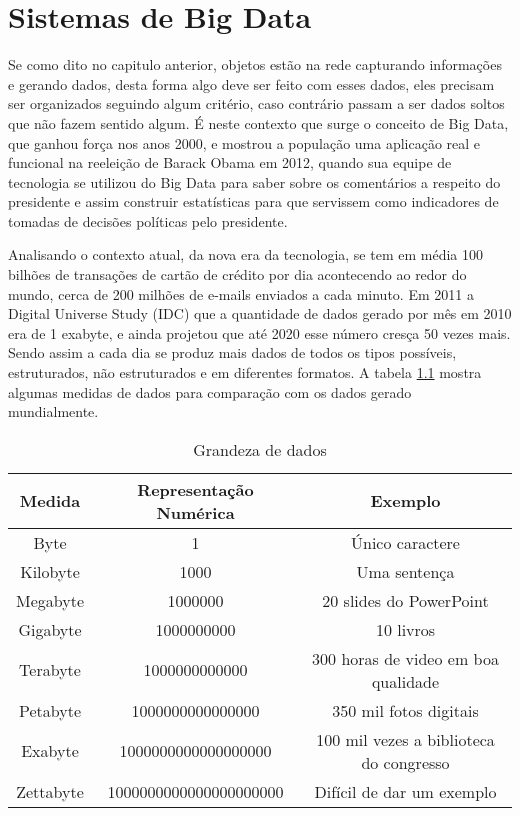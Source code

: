 \chapter{Sistemas de Big Data}
\label{chap:bigdata}
Se como dito no capitulo anterior, objetos estão na rede capturando informações e gerando dados, desta forma algo deve ser feito com esses dados, eles precisam ser organizados seguindo algum critério, caso contrário passam a ser dados soltos que não fazem sentido algum. É neste contexto que surge o conceito de Big Data, que ganhou força nos anos 2000, e mostrou a população uma aplicação real e funcional na reeleição de Barack Obama em 2012, quando sua equipe de tecnologia se utilizou do Big Data para saber sobre os comentários a respeito do presidente e assim construir estatísticas para que servissem como indicadores de tomadas de decisões políticas pelo presidente.

Analisando o contexto atual, da nova era da tecnologia, se tem em média 100 bilhões de transações de cartão de crédito por dia acontecendo ao redor do mundo, cerca de 200 milhões de e-mails enviados a cada minuto. Em 2011 a Digital Universe Study (IDC) que a quantidade de dados gerado por mês em 2010 era de 1 exabyte, e ainda projetou que até 2020 esse número cresça 50 vezes mais. Sendo assim a cada dia se produz mais dados de todos os tipos possíveis, estruturados, não estruturados e em diferentes formatos. A tabela \ref{tab:medidadados} mostra algumas medidas de dados para comparação com os dados gerado mundialmente.~\cite{sinha2014making}

\begin{table}[h]
\centering
\caption{Grandeza de dados}
\label{tab:medidadados}
\begin{tabular}{|c|c|c|}
\hline 
\rule[-1ex]{0pt}{2.5ex} \textbf{Medida} & \textbf{Representação Numérica} & \textbf{Exemplo} \\ 
\hline 
\rule[-1ex]{0pt}{2.5ex} Byte & 1 & Único caractere \\ 
\hline 
\rule[-1ex]{0pt}{2.5ex} Kilobyte & 1000 & Uma sentença \\ 
\hline 
\rule[-1ex]{0pt}{2.5ex} Megabyte & 1000000 & 20 slides do PowerPoint \\ 
\hline 
\rule[-1ex]{0pt}{2.5ex} Gigabyte & 1000000000 & 10 livros \\ 
\hline 
\rule[-1ex]{0pt}{2.5ex} Terabyte & 1000000000000 & 300 horas de video em boa qualidade \\ 
\hline 
\rule[-1ex]{0pt}{2.5ex} Petabyte & 1000000000000000 & 350 mil fotos digitais \\ 
\hline 
\rule[-1ex]{0pt}{2.5ex} Exabyte & 1000000000000000000 & 100 mil vezes a biblioteca do congresso \\ 
\hline 
\rule[-1ex]{0pt}{2.5ex} Zettabyte & 1000000000000000000000 & Difícil de dar um exemplo \\ 
\hline 
\end{tabular} 
\end{table}



